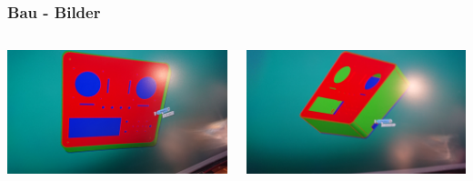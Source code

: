 \documentclass[12pt,a4paper, ngerman]{beamer}
\begin{document}
\begin{frame}
\frametitle{Bau - Bilder}
\begin{columns}
\begin{center}
\includegraphics[width=1\textwidth]{Ferni (1).jpeg}
\end{center}
\begin{center}
\includegraphics[width=1\textwidth]{Ferni (2).jpeg}
\end{center}
\end{columns}
\end{frame}
\end{document}
